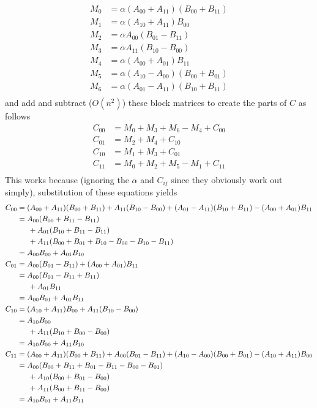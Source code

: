 \documentclass{article}         %
\begin{document}
\begin{equation}
\begin{split}
M_0&=\alpha(A_{00}+A_{11})(B_{00}+B_{11})\\
M_1&=\alpha(A_{10}+A_{11})B_{00}\\
M_2&=\alpha A_{00}(B_{01}-B_{11})\\
M_3&=\alpha A_{11}(B_{10}-B_{00})\\
M_4&=\alpha(A_{00}+A_{01})B_{11}\\
M_5&=\alpha(A_{10}-A_{00})(B_{00}+B_{01})\\
M_6&=\alpha(A_{01}-A_{11})(B_{10}+B_{11})\\
\end{split}
\end{equation}
and add and subtract ($O(n^2)$) these block matrices to create the parts of $C$ as follows
\begin{equation}
\begin{split}
C_{00}&=M_0+M_3+M_6-M_4+C_{00}\\
C_{01}&=M_2+M_4+C_{10}\\
C_{10}&=M_1+M_3+C_{01}\\
C_{11}&=M_0+M_2+M_5-M_1+C_{11}\\
\end{split}
\end{equation}
This works because (ignoring the $\alpha$ and $C_{ij}$ since they obviously work out simply), substitution of these equations yields
\begin{equation}
\begin{split}
C_{00}&=(A_{00}+A_{11})(B_{00}+B_{11})+A_{11}(B_{10}-B_{00})+(A_{01}-A_{11})(B_{10}+B_{11})-(A_{00}+A_{01})B_{11}\\
&=A_{00}(B_{00}+B_{11}-B_{11})\\
&\indent+A_{01}(B_{10}+B_{11}-B_{11})\\
&\indent+A_{11}(B_{00}+B_{01}+B_{10}-B_{00}-B_{10}-B_{11})\\
&=A_{00}B_{00}+A_{01}B_{10}\\
C_{01}&=A_{00}(B_{01}-B_{11})+(A_{00}+A_{01})B_{11}\\
&=A_{00}(B_{01}-B_{11}+B_{11})\\
&\indent+A_{01}B_{11}\\
&=A_{00}B_{01}+A_{01}B_{11}\\
C_{10}&=(A_{10}+A_{11})B_{00}+A_{11}(B_{10}-B_{00})\\
&=A_{10}B_{00}\\
&\indent+A_{11}(B_{10}+B_{00}-B_{00})\\
&=A_{10}B_{00}+A_{11}B_{10}\\
C_{11}&=(A_{00}+A_{11})(B_{00}+B_{11})+A_{00}(B_{01}-B_{11})+(A_{10}-A_{00})(B_{00}+B_{01})-(A_{10}+A_{11})B_{00}\\
&=A_{00}(B_{00}+B_{11}+B_{01}-B_{11}-B_{00}-B_{01})\\
&\indent+A_{10}(B_{00}+B_{01}-B_{00})\\
&\indent+A_{11}(B_{00}+B_{11}-B_{00})\\
&=A_{10}B_{01}+A_{11}B_{11}\\
\end{split}
\end{equation}
\end{document}
